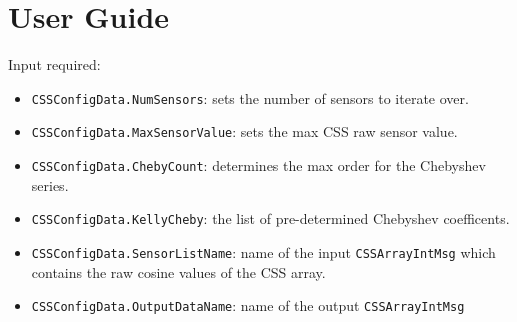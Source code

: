 
\section{User Guide}
Input required: 
\begin{itemize}

\item \verb~CSSConfigData.NumSensors~: sets the number of sensors to iterate over.
\item  \verb~CSSConfigData.MaxSensorValue~: sets the max CSS raw sensor value.
\item \verb~CSSConfigData.ChebyCount~: determines the max order for the Chebyshev series.
\item  \verb~CSSConfigData.KellyCheby~: the list of pre-determined Chebyshev coefficents.
\item  \verb~CSSConfigData.SensorListName~: name of the input \verb~CSSArrayIntMsg~ which contains the raw cosine values of the CSS array.
\item  \verb~CSSConfigData.OutputDataName~: name of the output \verb~CSSArrayIntMsg~

\end{itemize}
